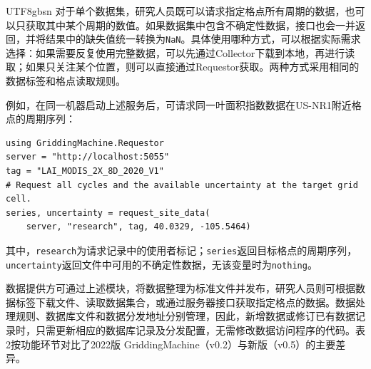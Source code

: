 \documentclass[numdoi]{chinese}
\begin{document}
\begin{CJK}{UTF8}{gbsn}
对于单个数据集，研究人员既可以请求指定格点所有周期的数据，也可以只获取其中某个周期的数值。如果数据集中包含不确定性数据，接口也会一并返回，并将结果中的缺失值统一转换为\nolinkurl{NaN}。具体使用哪种方式，可以根据实际需求选择：如果需要反复使用完整数据，可以先通过Collector下载到本地，再进行读取；如果只关注某个位置，则可以直接通过Requestor获取。两种方式采用相同的数据标签和格点读取规则。

例如，在同一机器启动上述服务后，可请求同一叶面积指数数据在US-NR1附近格点的周期序列：

\begingroup\singlespacing
\begin{Verbatim}[fontsize=\small,frame=single,framesep=5pt]
using GriddingMachine.Requestor
server = "http://localhost:5055"
tag = "LAI_MODIS_2X_8D_2020_V1"
# Request all cycles and the available uncertainty at the target grid cell.
series, uncertainty = request_site_data(
    server, "research", tag, 40.0329, -105.5464)
\end{Verbatim}
\endgroup

其中，\nolinkurl{research}为请求记录中的使用者标记；\nolinkurl{series}返回目标格点的周期序列，\nolinkurl{uncertainty}返回文件中可用的不确定性数据，无该变量时为\nolinkurl{nothing}。

数据提供方可通过上述模块，将数据整理为标准文件并发布，研究人员则可根据数据标签下载文件、读取数据集合，或通过服务器接口获取指定格点的数据。数据处理规则、数据库文件和数据分发地址分别管理，因此，新增数据或修订已有数据记录时，只需更新相应的数据库记录及分发配置，无需修改数据访问程序的代码。表2按功能环节对比了2022版 GriddingMachine（v0.2）与新版（v0.5）的主要差异。


\end{CJK}
\end{document}
